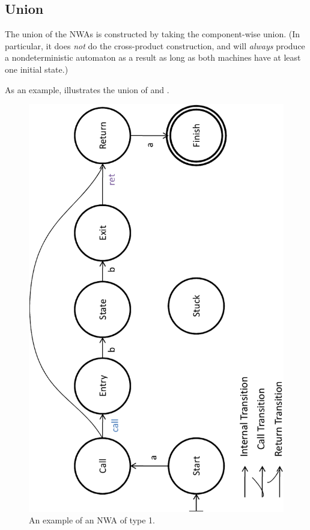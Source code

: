 \subsection{Union}
\label{Se:Union}
The
union of the NWAs is constructed by taking the component-wise union. (In
particular, it does \textsl{not} do the cross-product construction, and will
\textsl{always} produce a nondeterministic automaton as a result as long as
both machines have at least one initial state.)

As an example,  illustrates the union of  and
.


\begin{figure}[htb]
  \centering
    \includegraphics[width=12cm]{Figures/Figure1}
  \caption{An example of an NWA of type 1.}
  \label{Fig:Example1}
\end{figure}


